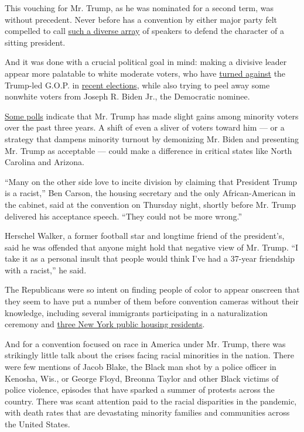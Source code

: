 This vouching for Mr. Trump, as he was nominated for a second term, was
without precedent. Never before has a convention by either major party
felt compelled to call
\href{https://www.nytimes3xbfgragh.onion/interactive/2020/08/28/us/politics/rnc-speakers-time.html}{such
a diverse array} of speakers to defend the character of a sitting
president.

And it was done with a crucial political goal in mind: making a divisive
leader appear more palatable to white moderate voters, who have
\href{https://www.nytimes3xbfgragh.onion/2020/03/04/us/politics/super-tuesday-virginia-voter-turnout.html}{turned
against} the Trump-led G.O.P. in
\href{https://www.nytimes3xbfgragh.onion/2019/11/14/us/kentucky-governor-race-matt-bevin.html}{recent
elections}, while also trying to peel away some nonwhite voters from
Joseph R. Biden Jr., the Democratic nominee.

\href{https://www.cnn.com/2020/07/21/politics/joe-biden-black-voters/index.html}{Some
polls} indicate that Mr. Trump has made slight gains among minority
voters over the past three years. A shift of even a sliver of voters
toward him --- or a strategy that dampens minority turnout by demonizing
Mr. Biden and presenting Mr. Trump as acceptable --- could make a
difference in critical states like North Carolina and Arizona.

``Many on the other side love to incite division by claiming that
President Trump is a racist,'' Ben Carson, the housing secretary and the
only African-American in the cabinet, said at the convention on Thursday
night, shortly before Mr. Trump delivered his acceptance speech. ``They
could not be more wrong.''

Herschel Walker, a former football star and longtime friend of the
president's, said he was offended that anyone might hold that negative
view of Mr. Trump. ``I take it as a personal insult that people would
think I've had a 37-year friendship with a racist,'' he said.

The Republicans were so intent on finding people of color to appear
onscreen that they seem to have put a number of them before convention
cameras without their knowledge, including several immigrants
participating in a naturalization ceremony and
\href{https://www.nytimes3xbfgragh.onion/2020/08/28/nyregion/nyc-tenants-rnc-video-trump.html}{three
New York public housing residents}.

And for a convention focused on race in America under Mr. Trump, there
was strikingly little talk about the crises facing racial minorities in
the nation. There were few mentions of Jacob Blake, the Black man shot
by a police officer in Kenosha, Wis., or George Floyd, Breonna Taylor
and other Black victims of police violence, episodes that have sparked a
summer of protests across the country. There was scant attention paid to
the racial disparities in the pandemic, with death rates that are
devastating minority families and communities across the United States.

